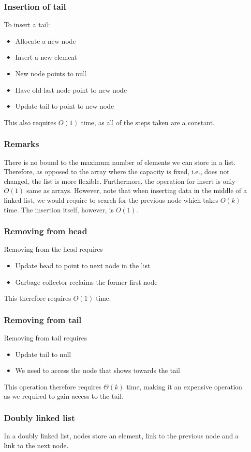 \documentclass[a4paper]{article}
\theoremstyle{plain}
\theoremstyle{definition}
\theoremstyle{remark}
\begin{document}
\subsubsection{Insertion of tail}
To insert a tail:
\begin{itemize}
	\item Allocate a new node
	\item Insert a new element
	\item New node points to null
	\item Have old last node point to new node
	\item Update tail to point to new node
\end{itemize}
This also requires $O(1)$ time, as all of the steps taken are a constant.
\subsubsection{Remarks}
There is no bound to the maximum number of elements we can store in a list. Therefore, as opposed to the array where the capacity is fixed, i.e., does not changed, the list is more flexible. Furthermore, the operation for insert is only $O(1)$ same as arrays. However, note that when inserting data in the middle of a linked list, we would require to search for the previous node which takes $O(k)$ time. The insertion itself, however, is $O(1)$.
\subsubsection{Removing from head}
Removing from the head requires
\begin{itemize}
	\item Update head to point to next node in the list
	\item Garbage collector reclaims the former first node
\end{itemize}
This therefore requires $O(1)$ time.
\subsubsection{Removing from tail}
Removing from tail requires
\begin{itemize}
	\item Update tail to null
	\item We need to access the node that shows towards the tail
\end{itemize}
This operation therefore requires $\Theta(k)$ time, making it an expensive operation as we required to gain access to the tail.
\subsubsection{Doubly linked list}
In a doubly linked list, nodes store an element, link to the previous node and a link to the next node.
\end{document}

